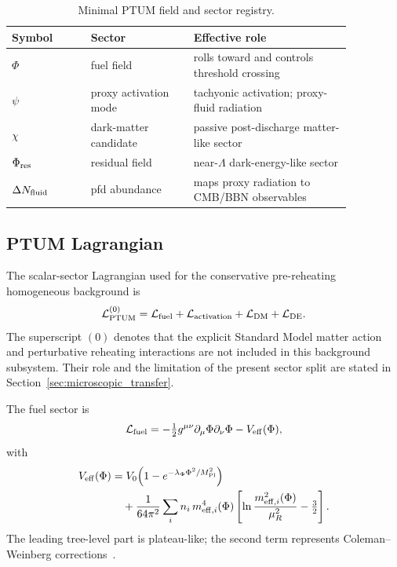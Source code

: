 \documentclass[epj]{svjour}
\begin{document}
\begin{table}[t]
\centering
\small
\caption{Minimal PTUM field and sector registry.}
\label{tab:ptum_field_registry}
\begin{tabular}{@{}>{\raggedright\arraybackslash}p{0.20\linewidth}>{\raggedright\arraybackslash}p{0.26\linewidth}>{\raggedright\arraybackslash}p{0.40\linewidth}@{}}
\toprule
Symbol & Sector & Effective role \\
\midrule
$\Phi$ & fuel field & rolls toward and controls threshold crossing \\
$\psi$ & proxy activation mode & tachyonic activation; proxy-fluid radiation \\
$\chi$ & dark-matter candidate & passive post-discharge matter-like sector \\
$\Phi_{\rm res}$ & residual field & near-$\Lambda$ dark-energy-like sector \\
$\Delta N_{\rm fluid}$ & pfd abundance & maps proxy radiation to CMB/BBN observables \\
\bottomrule
\end{tabular}
\end{table}

\subsection{PTUM Lagrangian}

The scalar-sector Lagrangian used for the conservative
pre-reheating homogeneous background is
\begin{equation}
\mathcal{L}_{\rm PTUM}^{(0)}
=\mathcal{L}_{\rm fuel}
+\mathcal{L}_{\rm activation}
+\mathcal{L}_{\rm DM}
+\mathcal{L}_{\rm DE}.
\end{equation}
The superscript \((0)\) denotes that the explicit Standard Model
matter action and perturbative reheating interactions are not included
in this background subsystem. Their role and the limitation of the
present sector split are stated in
Section~\ref{sec:microscopic_transfer}.

The fuel sector is
\begin{equation}
\mathcal{L}_{\rm fuel}
=-\tfrac{1}{2}g^{\mu\nu}\partial_\mu\Phi\partial_\nu\Phi
-V_{\rm eff}(\Phi),
\end{equation}
with
\begin{equation}
\begin{split}
V_{\rm eff}(\Phi)
&=V_0\!\left(1-e^{-\lambda_\Phi\Phi^2/M_{\rm Pl}^2}\right) \\
&\quad +\frac{1}{64\pi^2}
\sum_i n_i\,m_{{\rm eff},i}^4(\Phi)
\left[\ln\frac{m_{{\rm eff},i}^2(\Phi)}{\mu_R^2}
-\tfrac{3}{2}\right].
\end{split}
\label{eq:veff}
\end{equation}
The leading tree-level part is plateau-like; the second term
represents Coleman--Weinberg corrections~\cite{ColemanWeinberg}.
\end{document}
